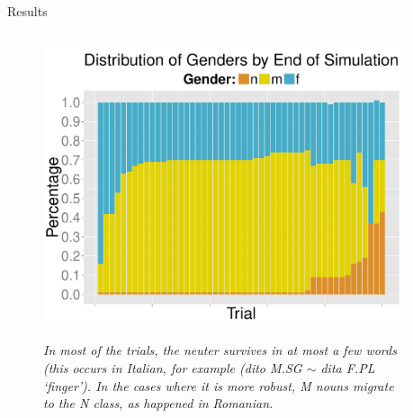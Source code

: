 \documentclass[final]{beamer}
\newlength{\twocolwid}
\begin{document}
\begin{frame}[t]
\begin{columns}[t]
\begin{column}{\twocolwid}
\begin{block}{Results}
\begin{columns}[t]
\begin{column}{.33\linewidth}
      \begin{figure}
    \begin{center} 
	\vspace{2cm}
	{\centering \includegraphics[width=1\textwidth]{genderdistribution.pdf}}
	\end{center}
	 \footnotesize
	\caption{\textit{In most of the trials, the neuter survives in at most a few words (this occurs in Italian, for example (\textit{dito} M.SG $\sim$ \textit{dita} F.PL `finger'). In the cases where it is more robust, M nouns migrate to the N class, as happened in Romanian.}}
	\label{gendist}
	\end{figure}
    \end{column}
 
      \begin{column}{.33\linewidth}
 	

\end{column}
\end{columns}
\end{block}
\end{column}
\end{columns}
\end{frame}
\end{document}
